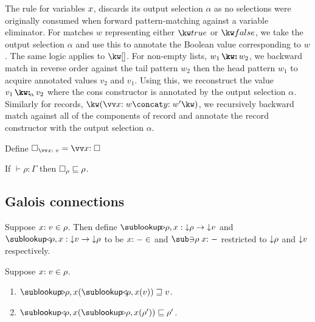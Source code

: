 The rule for variables $x$, discards its output selection $\alpha$ as no selections were originally consumed when forward pattern-matching against a variable eliminator. For matches $w$ representing either $\matchTrue$ or $\matchFalse$, we take the output selection $\alpha$ and use this to annotate the Boolean value corresponding to $w$. The same logic applies to $\matchNil$. For non-empty lists, $\matchCons{w_1}{w_2}$, we backward match in reverse order against the tail pattern $w_2$ then the head pattern $w_1$ to acquire annotated values $v_2$ and $v_1$. Using this, we reconstruct the value $\annCons{v_1}{v_2}{\alpha}$ where the cons constructor is annotated by the output selection $\alpha$. Similarly for records, $\matchRec{\vec{\bind{x}{w}} \concat \bind{y}{w'}}$, we recursively backward match against all of the components of record and annotate the record constructor with the output selection $\alpha$.



\begin{definition}
Define $\hole_{\vec{\bind{x}{v}}} = \vec{\bind{x}{\hole}}$
\end{definition}

\begin{lemma}
\label{lem:core-language:hole-env}If $\vdash \rho: \Gamma$ then $\square_{\rho} \sqsubseteq \rho$.
\end{lemma}

\subsection{Galois connections}
\label{sec:data-dependencies:analysis:galois-connections}

\begin{definition}
   Suppose $x{:}\;v\in{\rho}$. Then define $\envLookupFwdF{\rho,x}: \Below{\rho} \to \Below{v}$ and $\envLookupBwdF{\rho,x}: \Below{v} \to \Below{\rho}$ to be $x{:}\;-\in$ and $\envLookupBwdR{\rho}\bind{x}{-}$ restricted to ${\downarrow}{\rho}$ and ${\downarrow}{v}$ respectively.
\end{definition}

\begin{lemma}
\label{lem:core-language:env-get-put}Suppose $x{:}\;v\in{\rho}$.
\begin{enumerate}
   \item \label{lem:core-language:env-get-put:1} $\envLookupFwdF{\rho,x}(\envLookupBwdF{\rho,x}(v)) \geq v$.
   \item \label{lem:core-language:env-get-put:2} $\envLookupBwdF{\rho,x}(\envLookupFwdF{\rho,x}(\rho')) \leq \rho'$.
\end{enumerate}
\end{lemma}

